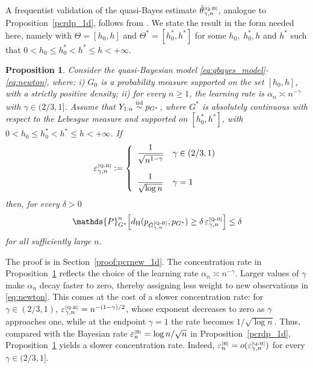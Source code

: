 \documentclass[twoside,12pt]{article}
\def\simiid{\stackrel{\mbox{\scriptsize{iid}}}{\sim}}
\renewcommand{\P}{\mathds{P}}
\newtheorem{prp}[thm]{Proposition}
\begin{document}
A frequentist validation of the quasi-Bayes estimate $\hat{\theta}^{\text{\tiny{[Q-B]}}}_{\gamma,n}$, analogue to Proposition~\ref{pcrdp_1d}, follows from  \citet[{Theorem 4.8 and }Corollary 4.10]{MarTok(09)}. We state the result in the form needed here, namely with $\Theta=[{h_0},h]$ and $\Theta^{\ast}=[{h_0^\ast},h^{\ast}]$ for some ${h_0,\;h_0^\ast,h}$ and $h^{\ast}$ such that  $0<h_0\leq h_0^*<h^\ast\leq h<+\infty$.

\begin{prp}\label{pcrnew_1d}
Consider the quasi-Bayesian model \eqref{eq:qbayes_model}-\eqref{eq:newton}, where: i) $G_0$ is a probability measure supported on the set $[h_0,h]$, with a strictly positive density; ii)  for every $n\geq 1$, the learning rate is $\alpha_n\asymp n^{-\gamma}$ with $\gamma\in(2/3,1]$. Assume that $Y_{1:n}\simiid p_{G^\ast}$, where $G^\ast$ is absolutely continuous with respect to the Lebesgue measure and supported on $[h_0^\ast,h^\ast]$, with $0<h_0\leq h_0^*<h^\ast\leq h<+\infty$. If
\begin{equation}\label{rate_new}
\varepsilon_{\gamma,n}^{\text{\tiny{[Q-B]}}}:=\left\{
\begin{array}{ll}
\dfrac{1}{\sqrt{n^{1-\gamma}}} &\gamma \in (2/3,1)\\
\\
\dfrac{1}{\sqrt{\log n}}&\gamma=1
\end{array}
\right.
\end{equation}
then, for every $\delta>0$
\begin{equation}\label{pcr_newton}
\P_{G^\ast}^n\!\left[d_{\mathrm H}(p_{\hat{G}_{\gamma,n}^{\text{\tiny{[Q-B]}}}},p_{G^\ast})\ge \delta\, \varepsilon_{\gamma,n}^{\text{\tiny{[Q-B]}}}\right]\le\delta
\end{equation}
for all sufficiently large $n$.
\end{prp}

The proof is in Section~\ref{proof:pcrnew_1d}. The concentration rate in Proposition~\ref{pcrnew_1d} reflects the choice of the learning rate $\alpha_n\asymp n^{-\gamma}$. Larger values of $\gamma$ make $\alpha_n$ decay faster to zero, thereby assigning less weight to new observations in \eqref{eq:newton}. This comes at the
cost of a slower concentration rate: for $\gamma\in(2/3,1)$, $\varepsilon_{\gamma,n}^{\text{\tiny{[Q-B]}}}=n^{-(1-\gamma)/2}$, whose exponent decreases to zero as $\gamma$ approaches one, while at the endpoint $\gamma=1$ the rate becomes $1/\sqrt{\log n}$. Thus, compared with the Bayesian rate $\varepsilon_n^{\text{\tiny{[B]}}}=\log n/\sqrt n$ in
Proposition~\ref{pcrdp_1d}, Proposition~\ref{pcrnew_1d} yields a slower concentration rate. Indeed, $\varepsilon_n^{\text{\tiny{[B]}}}=o(\varepsilon_{\gamma,n}^{\text{\tiny{[Q-B]}}})
$ for every \(\gamma\in(2/3,1]\).
\end{document}
